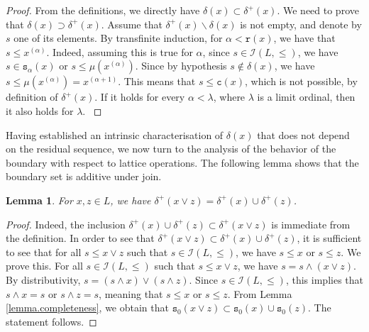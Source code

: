 \documentclass{article}
\newtheorem{lemma}[theorem]{Lemma}
\begin{document}
\begin{proof}
    {From the definitions, we directly have $\delta(x)\subset \delta^+(x)$. We need to prove that $\delta(x)\supset \delta^+(x)$. Assume that $\delta^+(x) \backslash \delta(x)$ is not empty, and denote by $s$ one of its elements. By transfinite induction, for $\alpha < \texttt{r}(x)$, we have that $s \le x^{(\alpha)}$. Indeed, assuming this is true for $\alpha$, since $s \in \mathcal{I}(L,\le)$, we have $s \in \texttt{s}_{\alpha}(x)$ or $s \le \mu(x^{(\alpha)})$. Since by hypothesis $s \notin \delta(x)$, we have $s \le \mu(x^{(\alpha)}) = x^{(\alpha+1)}$.
    This means that $s \le \texttt{c}(x)$, which is not possible, by definition of $\delta^+(x)$. If it holds for every $\alpha < \lambda$, where $\lambda$ is a limit ordinal, then it also holds for $\lambda$.
    }
\end{proof}

{Having established an intrinsic characterisation of \(\delta(x)\) that does not depend on the residual sequence, we now turn to the analysis of the behavior of the boundary with respect to lattice operations. The following lemma shows that the boundary set is additive under join.}

\begin{lemma}\label{prelemma.subadditivity.type}
{For $x, z \in L$, we have $\delta^+(x \vee z) = \delta^+(x) \cup \delta^+(z)$.}
\end{lemma}

\begin{proof}
    Indeed, the inclusion $\delta^+(x) \cup \delta^+(z) \subset \delta^+(x \vee z)$ is immediate from the definition. In order to see that $\delta^+(x \vee z) \subset \delta^+(x) \cup \delta^+(z)$, it is sufficient to see that for all $s \le x \vee z$ such that $s \in \mathcal{I}(L,\le)$, we have $s \le x$ or $s \le z$. We prove this. For all $s \in \mathcal{I}(L,\le)$ such that $s \le x \vee z$, we have $s = s \wedge (x \vee z)$. By distributivity, 
    $s = (s \wedge x) \vee (s \wedge z)$. Since $s \in \mathcal{I}(L,\le)$, this implies that $s \wedge x = s$ or $s \wedge z = s$, meaning that $s \le x$ or $s \le z$. From Lemma \ref{lemma.completeness}, 
    we obtain that 
    $\texttt{s}_0(x\vee z) \subset \texttt{s}_0(x) \cup \texttt{s}_0(z)$. The statement follows.
\end{proof}
\end{document}
